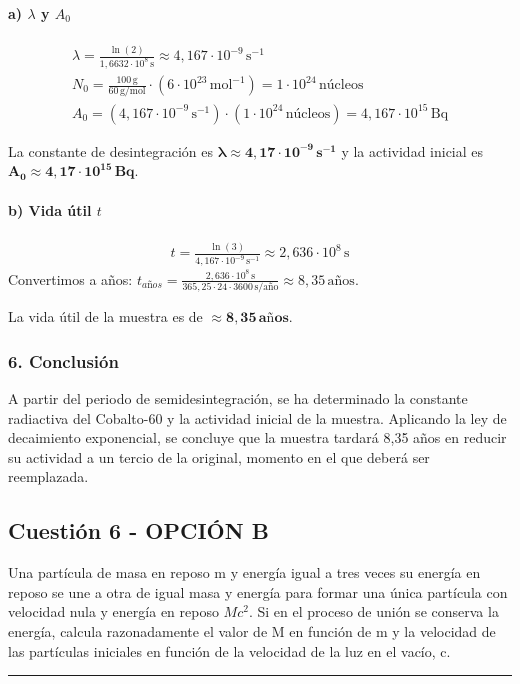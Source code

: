 \paragraph{a) $\lambda$ y $A_0$}
\begin{gather}
    \lambda = \frac{\ln(2)}{1,6632\cdot10^8\,\text{s}} \approx 4,167\cdot10^{-9}\,\text{s}^{-1} \\
    N_0 = \frac{100\,\text{g}}{60\,\text{g/mol}} \cdot (6\cdot10^{23}\,\text{mol}^{-1}) = 1\cdot10^{24}\,\text{núcleos} \\
    A_0 = (4,167\cdot10^{-9}\,\text{s}^{-1}) \cdot (1\cdot10^{24}\,\text{núcleos}) = 4,167\cdot10^{15}\,\text{Bq}
\end{gather}
\begin{cajaresultado}
La constante de desintegración es $\boldsymbol{\lambda \approx 4,17\cdot10^{-9}\,\textbf{s}^{-1}}$ y la actividad inicial es $\boldsymbol{A_0 \approx 4,17\cdot10^{15}\,\textbf{Bq}}$.
\end{cajaresultado}
\paragraph{b) Vida útil $t$}
\begin{gather}
    t = \frac{\ln(3)}{4,167\cdot10^{-9}\,\text{s}^{-1}} \approx 2,636\cdot10^8\,\text{s}
\end{gather}
Convertimos a años: $t_{años} = \frac{2,636\cdot10^8\,\text{s}}{365,25 \cdot 24 \cdot 3600\,\text{s/año}} \approx 8,35\,\text{años}$.
\begin{cajaresultado}
La vida útil de la muestra es de $\boldsymbol{\approx 8,35\,\textbf{años}}$.
\end{cajaresultado}
\subsubsection*{6. Conclusión}
\begin{cajaconclusion}
A partir del periodo de semidesintegración, se ha determinado la constante radiactiva del Cobalto-60 y la actividad inicial de la muestra. Aplicando la ley de decaimiento exponencial, se concluye que la muestra tardará 8,35 años en reducir su actividad a un tercio de la original, momento en el que deberá ser reemplazada.
\end{cajaconclusion}
\newpage

\subsection{Cuestión 6 - OPCIÓN B}
\label{subsec:6B_2019_jun_ord}
\begin{cajaenunciado}
Una partícula de masa en reposo m y energía igual a tres veces su energía en reposo se une a otra de igual masa y energía para formar una única partícula con velocidad nula y energía en reposo $Mc^2$. Si en el proceso de unión se conserva la energía, calcula razonadamente el valor de M en función de m y la velocidad de las partículas iniciales en función de la velocidad de la luz en el vacío, c.
\end{cajaenunciado}
\hrule
